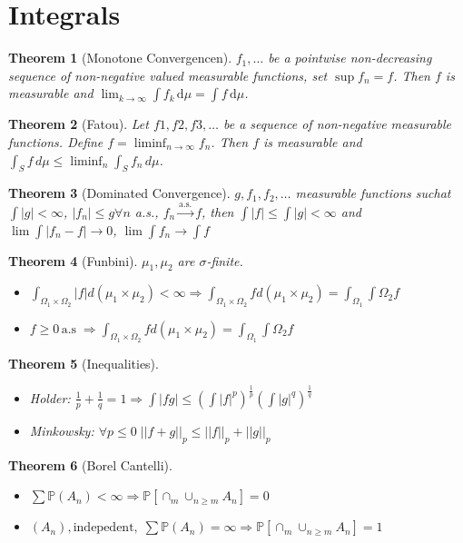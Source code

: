 \documentclass{article}
\newtheorem{theorem}{Theorem}
\begin{document}
\section{Integrals}
\begin{theorem}[Monotone Convergencen]
  $f_1, \ldots$  be a pointwise non-decreasing sequence of non-negative valued measurable functions, set $\sup f_n = f$. Then $f$ is measurable and
$\lim_{k\to\infty} \int f_k \, \mathrm{d}\mu = \int f \, \mathrm{d}\mu$.
\end{theorem}
\begin{theorem}[Fatou]
  Let $f1, f2, f3, \ldots$ be a sequence of non-negative measurable functions.  Define $f = \liminf_{n\to\infty} f_n$.
Then $f$ is measurable and $\int_S f\,d\mu \le \liminf_n \int_S f_n\,d\mu$.

\end{theorem}
\begin{theorem}[Dominated Convergence]
  $g, f_1, f_2, \ldots$ measurable functions suchat $\int |g| < \infty$, $|f_n| \le g \forall n$ a.s., $f_n \overset{\text{a.s.}}\rightarrow f$, then
  $\int |f| \le \int |g| < \infty$ and $\lim \int |f_n - f| \rightarrow 0$, $\lim \int f_n \rightarrow \int f$
\end{theorem}
\begin{theorem}[Funbini]
  $\mu_1, \mu_2$ are $\sigma$-finite.
  \begin{itemize}
  \item $\int_{\Omega_1 \times \Omega_2} |f| d(\mu_1 \times \mu_2) < \infty \Rightarrow
    \int_{\Omega_1 \times \Omega_2} f d(\mu_1 \times \mu_2)
    = \int_{\Omega_1}\int{\Omega_2} f$
  \item $f \ge 0 \, \text{a.s}\; \Rightarrow
    \int_{\Omega_1 \times \Omega_2} f d(\mu_1 \times \mu_2)
    = \int_{\Omega_1}\int{\Omega_2} f$
  \end{itemize}
\end{theorem}
\begin{theorem}[Inequalities]
  \begin{itemize}
  \item Holder: $ \frac1p + \frac1q = 1 \Rightarrow \int |fg| \le (\int |f|^p)^{\frac 1p}(\int |g|^q)^{\frac 1q}$
  \item Minkowsky: $\forall p \le 0 \; ||f + g||_p \le ||f||_p + ||g||_p$
  \end{itemize}
\end{theorem}
\begin{theorem}[Borel Cantelli]
  \begin{itemize}
  \item $\sum \mathbb P(A_n) < \infty \Rightarrow \mathbb P[\cap_m \cup_{n \ge m} A_n] = 0$
  \item $(A_n) ,\text{indepedent}, \; \sum \mathbb P(A_n) = \infty \Rightarrow \mathbb P[\cap_m \cup_{n \ge m} A_n] = 1$
  \end{itemize}
\end{theorem}
\end{document}

